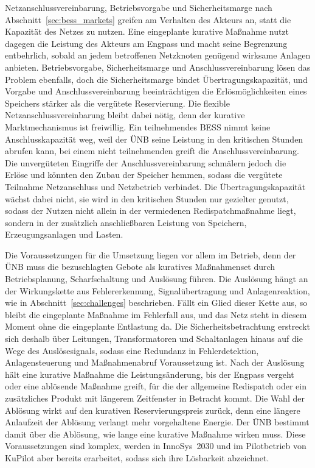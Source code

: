 Netzanschlussvereinbarung, Betriebsvorgabe und Sicherheitsmarge nach Abschnitt~\ref{sec:bess_markets} greifen am Verhalten des Akteurs an, statt die Kapazität des Netzes zu nutzen.
Eine eingeplante kurative Maßnahme nutzt dagegen die Leistung des Akteurs am Engpass und macht seine Begrenzung entbehrlich, sobald an jedem betroffenen Netzknoten genügend wirksame Anlagen anbieten.
Betriebsvorgabe, Sicherheitsmarge und Anschlussvereinbarung lösen das Problem ebenfalls, doch die Sicherheitsmarge bindet Übertragungskapazität, und Vorgabe und Anschlussvereinbarung beeinträchtigen die Erlösmöglichkeiten eines Speichers stärker als die vergütete Reservierung.
Die flexible Netzanschlussvereinbarung bleibt dabei nötig, denn der kurative Marktmechanismus ist freiwillig.
Ein teilnehmendes \ac{BESS} nimmt keine Anschlusskapazität weg, weil der \ac{ÜNB} seine Leistung in den kritischen Stunden abrufen kann, bei einem nicht teilnehmenden greift die Anschlussvereinbarung.
Die unvergüteten Eingriffe der Anschlussvereinbarung schmälern jedoch die Erlöse und könnten den Zubau der Speicher hemmen, sodass die vergütete Teilnahme Netzanschluss und Netzbetrieb verbindet.
Die Übertragungskapazität wächst dabei nicht, sie wird in den kritischen Stunden nur gezielter genutzt, sodass der Nutzen nicht allein in der vermiedenen Redispatchmaßnahme liegt, sondern in der zusätzlich anschließbaren Leistung von Speichern, Erzeugungsanlagen und Lasten.

Die Voraussetzungen für die Umsetzung liegen vor allem im Betrieb, denn der \ac{ÜNB} muss die bezuschlagten Gebote als kuratives Maßnahmenset durch Betriebsplanung, Scharfschaltung und Auslösung führen.
Die Auslösung hängt an der Wirkungskette aus Fehlererkennung, Signalübertragung und Anlagenreaktion, wie in Abschnitt~\ref{sec:challenges} beschrieben.
Fällt ein Glied dieser Kette aus, so bleibt die eingeplante Maßnahme im Fehlerfall aus, und das Netz steht in diesem Moment ohne die eingeplante Entlastung da.
Die Sicherheitsbetrachtung erstreckt sich deshalb über Leitungen, Transformatoren und Schaltanlagen hinaus auf die Wege des Auslösesignals, sodass eine Redundanz in Fehlerdetektion, Anlagensteuerung und Maßnahmenabruf Voraussetzung ist.
Nach der Auslösung hält eine kurative Maßnahme die Leistungsänderung, bis der Engpass vergeht oder eine ablösende Maßnahme greift, für die der allgemeine Redispatch oder ein zusätzliches Produkt mit längerem Zeitfenster in Betracht kommt.
Die Wahl der Ablösung wirkt auf den kurativen Reservierungspreis zurück, denn eine längere Anlaufzeit der Ablösung verlangt mehr vorgehaltene Energie.
Der \ac{ÜNB} bestimmt damit über die Ablösung, wie lange eine kurative Maßnahme wirken muss.
Diese Voraussetzungen sind komplex, werden in InnoSys~2030 und im Pilotbetrieb von KuPilot aber bereits erarbeitet, sodass sich ihre Lösbarkeit abzeichnet.

